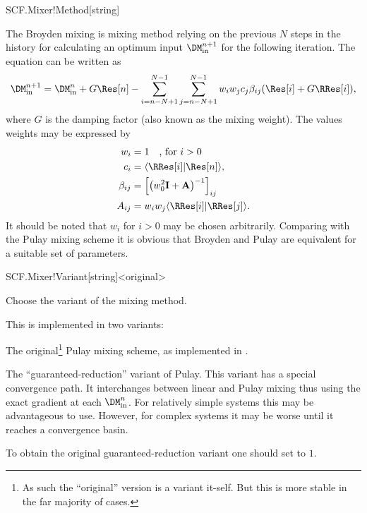 \begin{fdfentry}{SCF.Mixer!Method}[string]
\begin{fdfoptions}
    \option[Broyden] %
    The Broyden mixing is mixing method relying on the previous $N$
    steps in the history for calculating an optimum input
    $\DM^{n+1}_{\mathrm{in}}$ for the following iteration.  The
    equation can be written as
    \begin{equation}
      \DM^{n+1}_{\mathrm{in}} = \DM^n_{\mathrm{in}} + G \Res[n]
      - \sum_{i=n-N+1}^{N-1}\sum_{j=n-N+1}^{N-1} w_iw_j c_j \beta_{ij} (\Res[i] + G \RRes[i]),
    \end{equation}
    where $G$ is the damping factor (also known as
    the mixing weight).
    The values weights may be expressed by
    \begin{align}
      w_i &= 1 \quad\text{, for }i>0
      \\
      c_i &= \langle \RRes[i] | \Res[n] \rangle,
      \\
      \beta_{ij} &= \Big[\big(w_0^2\mathbf I + \mathbf
      A\big)^{-1}\Big]_{ij}
      \\
      A_{ij} &= w_iw_j \langle \RRes[i] | \RRes[j] \rangle.
    \end{align}
    It should be noted that $w_i$ for $i>0$ may be chosen arbitrarily.
    Comparing with the Pulay mixing scheme it is obvious that Broyden
    and Pulay are equivalent for a suitable set of parameters.

  \end{fdfoptions}
  
\end{fdfentry}

\begin{fdfentry}{SCF.Mixer!Variant}[string]<original>

  Choose the variant of the mixing method.

  \begin{fdfoptions}

    \option[Pulay] %
    This is implemented in two variants:
    \begin{fdfoptions}

      The original\footnote{As such the ``original'' version is a
          variant it-self. But this is more stable in the far majority
          of cases.} Pulay mixing scheme, as implemented in
      \citet{Kresse1996}.
      
      \option[GR] %
      The ``guaranteed-reduction'' variant of
      Pulay\cite{Bowler2000}. This variant has a special convergence
      path. It interchanges between linear and Pulay mixing thus using
      the exact gradient at each $\DM^n_{\mathrm{in}}$.  For
      relatively simple systems this may be advantageous to
      use. However, for complex systems it may be worse until it
      reaches a convergence basin.

      To obtain the original guaranteed-reduction variant one should
      set  to $1$.

    \end{fdfoptions}

  \end{fdfoptions}

\end{fdfentry}

